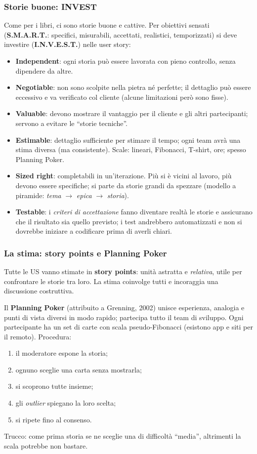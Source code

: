 \documentclass[a4paper,12pt]{article}
\begin{document}
\subsubsection{Storie buone: INVEST}
Come per i libri, ci sono storie buone e cattive. Per obiettivi sensati
(\textbf{S.M.A.R.T.}: specifici, misurabili, accettati, realistici, temporizzati) si
deve investire (\textbf{I.N.V.E.S.T.}) nelle user story:
\begin{itemize}
  \item \textbf{Independent}: ogni storia può essere lavorata con pieno controllo, senza
        dipendere da altre.
  \item \textbf{Negotiable}: non sono scolpite nella pietra né perfette; il dettaglio può
        essere eccessivo e va verificato col cliente (alcune limitazioni però sono fisse).
  \item \textbf{Valuable}: devono mostrare il vantaggio per il cliente e gli altri
        partecipanti; servono a evitare le ``storie tecniche''.
  \item \textbf{Estimable}: dettaglio sufficiente per stimare il tempo; ogni team avrà
        una stima diversa (ma consistente). Scale: lineari, Fibonacci, T-shirt, ore;
        spesso Planning Poker.
  \item \textbf{Sized right}: completabili in un'iterazione. Più si è vicini al lavoro,
        più devono essere specifiche; si parte da storie grandi da spezzare (modello a
        piramide: \emph{tema} $\to$ \emph{epica} $\to$ \emph{storia}).
  \item \textbf{Testable}: i \emph{criteri di accettazione} fanno diventare realtà le
        storie e assicurano che il risultato sia quello previsto; i test andrebbero
        automatizzati e non si dovrebbe iniziare a codificare prima di averli chiari.
\end{itemize}

\subsubsection{La stima: story points e Planning Poker}
Tutte le US vanno stimate in \textbf{story points}: unità astratta e \emph{relativa},
utile per confrontare le storie tra loro. La stima coinvolge tutti e incoraggia una
discussione costruttiva.

Il \textbf{Planning Poker} (attribuito a Grenning, 2002) unisce esperienza, analogia e
punti di vista diversi in modo rapido; partecipa tutto il team di sviluppo. Ogni
partecipante ha un set di carte con scala pseudo-Fibonacci (esistono app e siti per il
remoto). Procedura:
\begin{enumerate}
  \item il moderatore espone la storia;
  \item ognuno sceglie una carta senza mostrarla;
  \item si scoprono tutte insieme;
  \item gli \emph{outlier} spiegano la loro scelta;
  \item si ripete fino al consenso.
\end{enumerate}
Trucco: come prima storia se ne sceglie una di difficoltà ``media'', altrimenti la scala
potrebbe non bastare.
\end{document}
